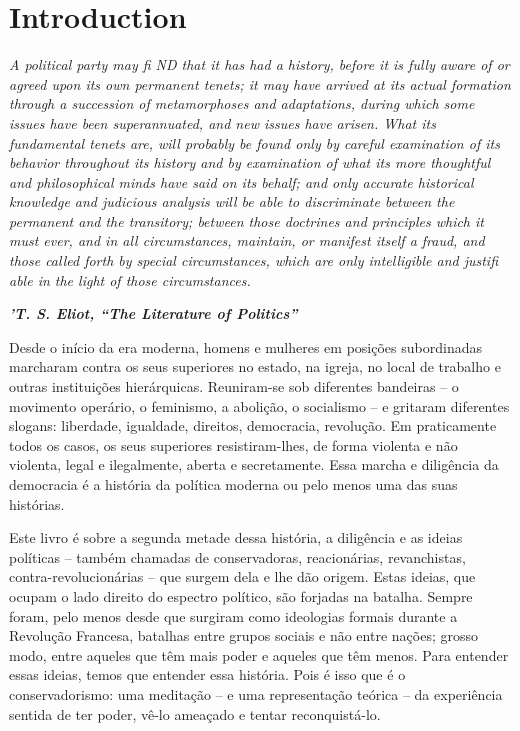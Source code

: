  
 \chapter{Introduction}  

 \label{Introduction}  
 
 
\par
 
 
 \textit{	A political party may ﬁ ND that it has had a history, before it is fully aware of or agreed upon its own permanent tenets; it may have arrived at its actual formation through a succession of metamorphoses and adaptations, during which some issues have been superannuated, and new issues have arisen. What its fundamental tenets are, will probably be found only by careful examination of its behavior throughout its history and by examination of what its more thoughtful and philosophical minds have said on its behalf; and only accurate historical knowledge and judicious analysis will be able to discriminate between the permanent and the transitory; between those doctrines and principles which it must ever, and in all circumstances, maintain, or manifest itself a fraud, and those called forth by special circumstances, which are only intelligible and justiﬁ able in the light of those circumstances.}  

 
\par
 
 
 
\par
 

 \textbf{\textit{	’T. S. Eliot, “The Literature of Politics”} }  

 
\par
 
Desde o início da era moderna, homens e mulheres em posições subordinadas marcharam contra os seus superiores no estado, na igreja, no local de trabalho e outras instituições hierárquicas. Reuniram-se sob diferentes bandeiras – o movimento operário, o feminismo, a abolição, o socialismo – e gritaram diferentes slogans: liberdade, igualdade, direitos, democracia, revolução. Em praticamente todos os casos, os seus superiores resistiram-lhes, de forma violenta e não violenta, legal e ilegalmente, aberta e secretamente. Essa marcha e diligência da democracia é a história da política moderna ou pelo menos uma das suas histórias.
 
\par
 
Este livro é sobre a segunda metade dessa história, a diligência e as ideias políticas – também chamadas de conservadoras, reacionárias, revanchistas, contra-revolucionárias – que surgem dela e lhe dão origem. Estas ideias, que ocupam o lado direito do espectro político, são forjadas na batalha. Sempre foram, pelo menos desde que surgiram como ideologias formais durante a Revolução Francesa, batalhas entre grupos sociais e não entre nações; grosso modo, entre aqueles que têm mais poder e aqueles que têm menos. Para entender essas ideias, temos que entender essa história. Pois é isso que é o conservadorismo: uma meditação – e uma representação teórica – da experiência sentida de ter poder, vê-lo ameaçado e tentar reconquistá-lo.
 
